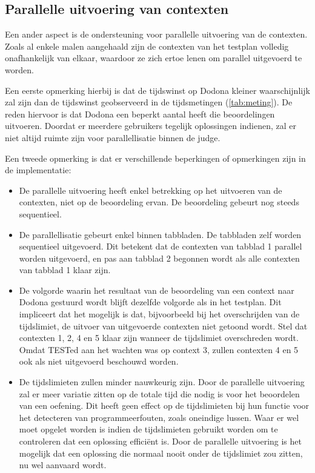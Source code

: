 \subsection{Parallelle uitvoering van contexten}\label{subsec:parallelle-uitvoering-van-contexten}

Een ander aspect is de ondersteuning voor parallelle uitvoering van de contexten.
Zoals al enkele malen aangehaald zijn de contexten van het testplan volledig onafhankelijk van elkaar, waardoor ze zich ertoe lenen om parallel uitgevoerd te worden.

Een eerste opmerking hierbij is dat de tijdswinst op Dodona kleiner waarschijnlijk zal zijn dan de tijdswinst geobserveerd in de tijdsmetingen (\cref{tab:meting}).
De reden hiervoor is dat Dodona een beperkt aantal  heeft die beoordelingen uitvoeren.
Doordat er meerdere gebruikers tegelijk oplossingen indienen, zal er niet altijd ruimte zijn voor parallellisatie binnen de judge.

Een tweede opmerking is dat er verschillende beperkingen of opmerkingen zijn in de implementatie:

\begin{itemize}
    \item De parallelle uitvoering heeft enkel betrekking op het uitvoeren van de contexten, niet op de beoordeling ervan.
    De beoordeling gebeurt nog steeds sequentieel.
    \item De parallellisatie gebeurt enkel binnen tabbladen.
    De tabbladen zelf worden sequentieel uitgevoerd.
    Dit betekent dat de contexten van tabblad 1 parallel worden uitgevoerd, en pas aan tabblad 2 begonnen wordt als alle contexten van tabblad 1 klaar zijn.
    \item De volgorde waarin het resultaat van de beoordeling van een context naar Dodona gestuurd wordt blijft dezelfde volgorde als in het testplan.
    Dit impliceert dat het mogelijk is dat, bijvoorbeeld bij het overschrijden van de tijdslimiet, de uitvoer van uitgevoerde contexten niet getoond wordt.
    Stel dat contexten 1, 2, 4 en 5 klaar zijn wanneer de tijdslimiet overschreden wordt.
    Omdat TESTed aan het wachten was op context 3, zullen contexten 4 en 5 ook als niet uitgevoerd beschouwd worden.
    \item De tijdslimieten zullen minder nauwkeurig zijn.
    Door de parallelle uitvoering zal er meer variatie zitten op de totale tijd die nodig is voor het beoordelen van een oefening.
    Dit heeft geen effect op de tijdslimieten bij hun functie voor het detecteren van programmeerfouten, zoals oneindige lussen.
    Waar er wel moet opgelet worden is indien de tijdslimieten gebruikt worden om te controleren dat een oplossing efficiënt is.
    Door de parallelle uitvoering is het mogelijk dat een oplossing die normaal nooit onder de tijdslimiet zou zitten, nu wel aanvaard wordt.
\end{itemize}

